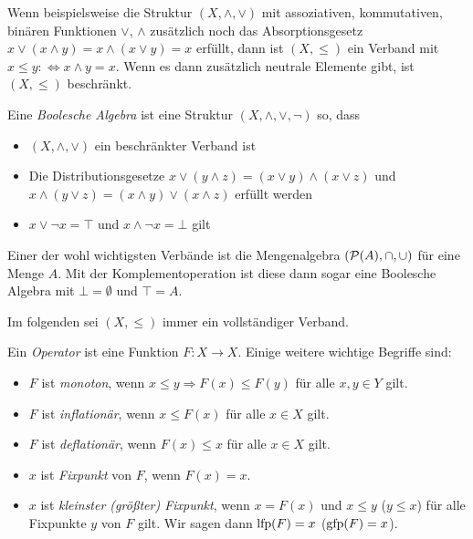 Wenn beispielsweise die Struktur $(X,\land,\lor)$ mit assoziativen, kommutativen, binären Funktionen $\lor$, $\land$ zusätzlich noch das Absorptionsgesetz $x\lor(x\land y) = x\land (x \lor y) = x$ erfüllt, dann ist $(X,\leq)$ ein Verband mit $x\leq y :\Leftrightarrow x\land y = x$. Wenn es dann zusätzlich neutrale Elemente gibt, ist $(X,\leq)$ beschränkt.

\begin{definition}
	Eine \textit{Boolesche Algebra} ist eine Struktur $(X,\land,\lor,\neg)$ so, dass
	\begin{itemize}
		\item $(X,\land, \lor)$ ein beschränkter Verband ist
		\item Die Distributionsgesetze $x\lor( y\land z)= (x\lor y) \land (x\lor z)$ und $x \land (y\lor z) = (x\land y) \lor (x\land z)$ erfüllt werden
		\item $x\lor \neg x=\top$ und $x\land \neg x=\bot$ gilt
	\end{itemize}
\end{definition}

Einer der wohl wichtigsten Verbände ist die Mengenalgebra $(\mathcal{P}(A),\cap,\cup)$ für eine Menge $A$. Mit der Komplementoperation ist diese dann sogar eine Boolesche Algebra mit $\bot=\emptyset$ und $\top=A$.

Im folgenden sei $(X,\leq)$ immer ein vollständiger Verband.

\begin{definition}[Operatoren]
	Ein \textit{Operator} ist eine Funktion $F:X\to X$.
	Einige weitere wichtige Begriffe sind:
	\begin{itemize}
		\item $F$ ist \textit{monoton}, wenn $x\leq y \Rightarrow F(x)\leq F(y)$ für alle $x,y\in Y$ gilt.
		\item $F$ ist \textit{inflationär}, wenn $x\leq F(x)$ für alle $x\in X$ gilt.
		\item $F$ ist \textit{deflationär}, wenn $F(x)\leq x$ für alle $x\in X$ gilt.
		\item $x$ ist \textit{Fixpunkt} von $F$, wenn $F(x)=x$.
		\item $x$ ist \textit{kleinster (größter) Fixpunkt}, wenn $x=F(x)$ und $x\leq y$ ($y\leq x$) für alle Fixpunkte $y$ von $F$ gilt. Wir sagen dann $\operatorname{lfp}(F)=x$ ($\operatorname{gfp}(F)=x$).
	\end{itemize}
\end{definition}


